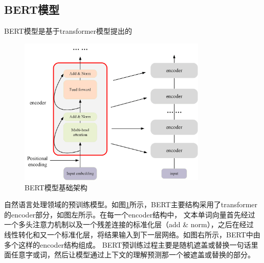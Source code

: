 \subsection{BERT模型}
BERT模型是基于transformer模型提出的
\begin{figure}[htb]%
	\setlength{\belowcaptionskip}{0pt}
	\centering
	\includegraphics[width=0.8\textwidth]{pic/2-15.png}
	\caption{BERT模型基础架构}
	\label{bert}
\end{figure}
自然语言处理领域的预训练模型。如图\ref{bert}所示，BERT主要结构采用了transformer的encoder部分，如图左所示。在每一个encoder结构中，
文本单词向量首先经过一个多头注意力机制以及一个残差连接的标准化层（add \& norm），之后在经过
线性转化和又一个标准化层，将结果输入到下一层网络。如图右所示，BERT中由多个这样的encoder结构组成。
BERT预训练过程主要是随机遮盖或替换一句话里面任意字或词，然后让模型通过上下文的理解预测那一个被遮盖或替换的部分。

